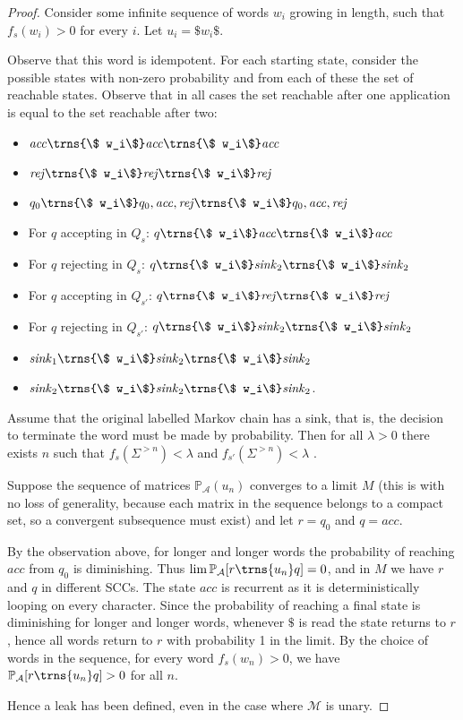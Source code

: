 \documentclass[10pt,a4paper]{amsart}
\numberwithin{equation}{section}
\theoremstyle{plain}
\theoremstyle{definition}
\theoremstyle{remark}
\newcommand\acc{\mathit{acc}}
\newcommand\rej{\mathit{rej}}
\newcommand\sink{\mathit{sink}}
\newcommand\lmc{\mathcal{M}}
\newcommand\pr{\mathbb{P}}
\newcommand\pa{\mathcal{A}}
\renewcommand\nu{f}
\begin{document}
\begin{proof}

Consider some infinite sequence of words $w_i$ growing in length, such that $\nu_s(w_i) > 0$ for every $i$.
Let $u_i = \$ w_i\$$.

Observe that this word is idempotent. For each starting state, consider the possible states with non-zero probability and from each of these the set of reachable states. Observe that in all cases the set reachable after one application is equal to the set reachable after two:
\begin{itemize}
\item $\acc \trns{\$ w_i\$} \acc \trns{\$ w_i\$} \acc $
\item $\rej \trns{\$ w_i\$} \rej \trns{\$ w_i\$} \rej $
\item $q_0 \trns{\$ w_i\$} q_0, \acc, \rej \trns{\$ w_i\$} q_0,\acc,\rej $

\item For $q$ accepting in $Q_s$:
$q \trns{\$ w_i\$} \acc \trns{\$ w_i\$} \acc $

\item For $q$ rejecting in $Q_s$:
$q \trns{\$ w_i\$}  \sink_2 \trns{\$ w_i\$} \sink_2 $

\item For $q$ accepting in $Q_{s'}$:
$q \trns{\$ w_i\$}  \rej \trns{\$ w_i\$} \rej $

\item For $q$ rejecting in $Q_{s'}$:
$q \trns{\$ w_i\$}  \sink_2 \trns{\$ w_i\$} \sink_2 $

\item
$\sink_1 \trns{\$ w_i\$}  \sink_2 \trns{\$ w_i\$} \sink_2 $
\item
$\sink_2 \trns{\$ w_i\$}  \sink_2 \trns{\$ w_i\$} \sink_2 $.
  \end{itemize}

\noindent Assume that the original labelled Markov chain has a sink, that is, the decision to terminate the word must be made by probability. Then for all $\lambda > 0$ there exists $n$ such that $\nu_s(\Sigma^{>n}) < \lambda$ and $\nu_{s'}(\Sigma^{>n}) < \lambda$ \cite[Lemma 12]{kiefer2018computing}.

Suppose the sequence of matrices $\pr_\pa(u_n)$ converges to a limit $M$ (this is with no loss of generality, because each matrix in the sequence belongs to a compact set, so a convergent subsequence must exist) and let $r = q_0$ and $q = \acc$.

By the observation above, for longer and longer words the probability of reaching $\acc$ from $q_0$ is diminishing. Thus $\lim \pr_\pa[r \trns{u_n} q] = 0$, and in $M$ we have $r$ and $q$ in different SCCs. The state $\acc$ is recurrent as it is deterministically looping on every character. Since the probability of reaching a final state is diminishing for longer and longer words, whenever $\$$ is read the state returns to $r$, hence all words return to $r$ with probability 1 in the limit. By the choice of words in the sequence, for every word $\nu_s(w_n) > 0$, we have $\pr_\pa[r \trns{u_n} q]>0$ for all $n$.

Hence a leak has been defined, even in the case where $\lmc$ is unary.
\end{proof}
\end{document}
